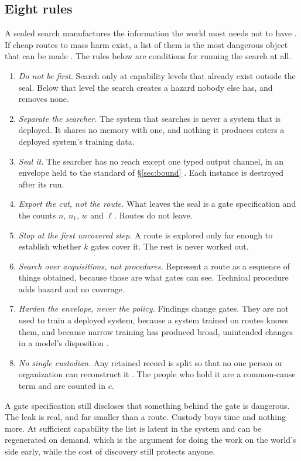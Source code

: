 \documentclass[10pt,twocolumn]{article}
\theoremstyle{plain}
\theoremstyle{definition}
\begin{document}
\subsection{Eight rules}

A sealed search manufactures the information the world most needs not to have
\cite{bostrom2011}. If cheap routes to mass harm exist, a list of them is the most dangerous
object that can be made \cite{bostrom2019}. The rules below are conditions for running the
search at all.

\begin{enumerate}[itemsep=1pt]
\item \emph{Do not be first.} Search only at capability levels that already exist outside the
seal. Below that level the search creates a hazard nobody else has, and removes none.
\item \emph{Separate the searcher.} The system that searches is never a system that is
deployed. It shares no memory with one, and nothing it produces enters a deployed system's
training data.
\item \emph{Seal it.} The searcher has no reach except one typed output channel, in an
envelope held to the standard of \S\ref{sec:bound} \cite{armstrong2012}. Each instance is
destroyed after its run.
\item \emph{Export the cut, not the route.} What leaves the seal is a gate specification and
the counts $n$, $n_{1}$, $w$ and $\ell$. Routes do not leave.
\item \emph{Stop at the first uncovered step.} A route is explored only far enough to
establish whether $k$ gates cover it. The rest is never worked out.
\item \emph{Search over acquisitions, not procedures.} Represent a route as a sequence of
things obtained, because those are what gates can see. Technical procedure adds hazard and no
coverage.
\item \emph{Harden the envelope, never the policy.} Findings change gates. They are not used
to train a deployed system, because a system trained on routes knows them, and because narrow
training has produced broad, unintended changes in a model's disposition
\cite{betley2025}.
\item \emph{No single custodian.} Any retained record is split so that no one person or
organization can reconstruct it \cite{shamir1979}. The people who hold it are a common-cause
term and are counted in $c$.
\end{enumerate}

A gate specification still discloses that something behind the gate is dangerous. The leak is
real, and far smaller than a route. Custody
buys time and nothing more. At sufficient capability the list is latent in the system and
can be regenerated on demand, which is the argument for doing the work on the world's side
early, while the cost of discovery still protects anyone.
\end{document}
